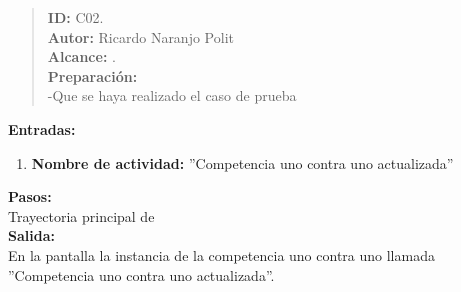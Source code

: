 

\begin{quote} %
	\textbf{ID:} C02.\\
    \textbf{Autor: } Ricardo Naranjo Polit\\
	\textbf{Alcance:}  .\\
    \textbf{Preparación:}\\
      -Que se haya realizado el caso de prueba \\

\end{quote}

    \textbf{Entradas:}\\
    \begin{enumerate}
        \item \textbf{Nombre de actividad:} ''Competencia uno contra uno actualizada''
    \end{enumerate}
    \textbf{Pasos:}\\

    Trayectoria principal de \\

    \textbf{Salida:}\\

     En la pantalla  la instancia de la competencia uno contra uno llamada ''Competencia uno contra uno actualizada''.
